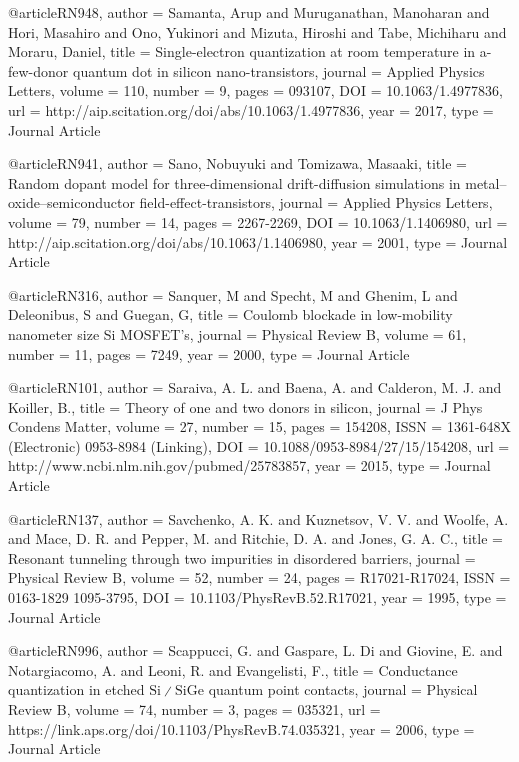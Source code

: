 @article{RN948,
   author = {Samanta, Arup and Muruganathan, Manoharan and Hori, Masahiro and Ono, Yukinori and Mizuta, Hiroshi and Tabe, Michiharu and Moraru, Daniel},
   title = {Single-electron quantization at room temperature in a-few-donor quantum dot in silicon nano-transistors},
   journal = {Applied Physics Letters},
   volume = {110},
   number = {9},
   pages = {093107},
   DOI = {10.1063/1.4977836},
   url = {http://aip.scitation.org/doi/abs/10.1063/1.4977836},
   year = {2017},
   type = {Journal Article}
}

@article{RN941,
   author = {Sano, Nobuyuki and Tomizawa, Masaaki},
   title = {Random dopant model for three-dimensional drift-diffusion simulations in metal–oxide–semiconductor field-effect-transistors},
   journal = {Applied Physics Letters},
   volume = {79},
   number = {14},
   pages = {2267-2269},
   DOI = {10.1063/1.1406980},
   url = {http://aip.scitation.org/doi/abs/10.1063/1.1406980},
   year = {2001},
   type = {Journal Article}
}

@article{RN316,
   author = {Sanquer, M and Specht, M and Ghenim, L and Deleonibus, S and Guegan, G},
   title = {Coulomb blockade in low-mobility nanometer size Si MOSFET’s},
   journal = {Physical Review B},
   volume = {61},
   number = {11},
   pages = {7249},
   year = {2000},
   type = {Journal Article}
}

@article{RN101,
   author = {Saraiva, A. L. and Baena, A. and Calderon, M. J. and Koiller, B.},
   title = {Theory of one and two donors in silicon},
   journal = {J Phys Condens Matter},
   volume = {27},
   number = {15},
   pages = {154208},
   ISSN = {1361-648X (Electronic)
0953-8984 (Linking)},
   DOI = {10.1088/0953-8984/27/15/154208},
   url = {http://www.ncbi.nlm.nih.gov/pubmed/25783857},
   year = {2015},
   type = {Journal Article}
}

@article{RN137,
   author = {Savchenko, A. K. and Kuznetsov, V. V. and Woolfe, A. and Mace, D. R. and Pepper, M. and Ritchie, D. A. and Jones, G. A. C.},
   title = {Resonant tunneling through two impurities in disordered barriers},
   journal = {Physical Review B},
   volume = {52},
   number = {24},
   pages = {R17021-R17024},
   ISSN = {0163-1829
1095-3795},
   DOI = {10.1103/PhysRevB.52.R17021},
   year = {1995},
   type = {Journal Article}
}

@article{RN996,
   author = {Scappucci, G. and Gaspare, L. Di and Giovine, E. and Notargiacomo, A. and Leoni, R. and Evangelisti, F.},
   title = {Conductance quantization in etched $\mathrm{Si}∕\mathrm{Si}\mathrm{Ge}$ quantum point contacts},
   journal = {Physical Review B},
   volume = {74},
   number = {3},
   pages = {035321},
   url = {https://link.aps.org/doi/10.1103/PhysRevB.74.035321},
   year = {2006},
   type = {Journal Article}
}


